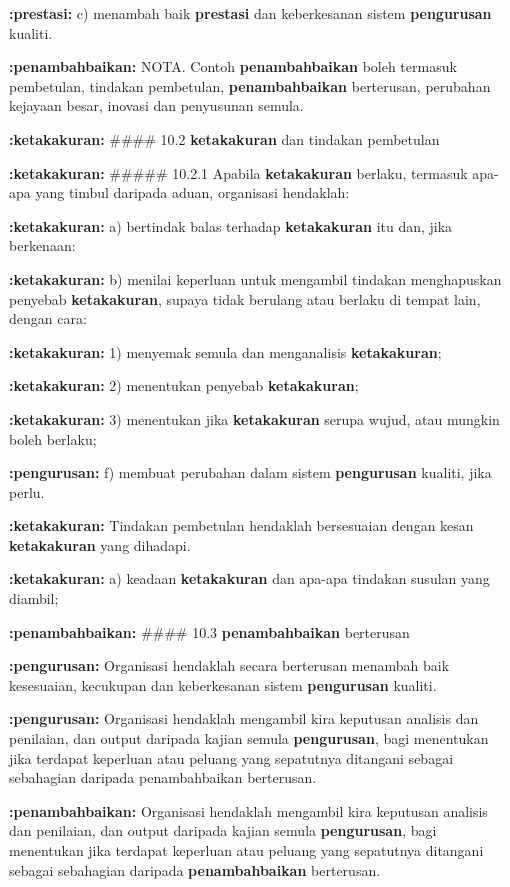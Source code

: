 \documentclass{article}
\begin{document}
\textbf{:prestasi:} c) menambah baik \textbf{prestasi} dan keberkesanan sistem \textbf{pengurusan} kualiti.

\textbf{:penambahbaikan:} NOTA. Contoh \textbf{penambahbaikan} boleh termasuk pembetulan, tindakan pembetulan, \textbf{penambahbaikan}
berterusan, perubahan kejayaan besar, inovasi dan penyusunan semula.

\textbf{:ketakakuran:} \#\#\#\# 10.2 \textbf{ketakakuran} dan tindakan pembetulan

\textbf{:ketakakuran:} \#\#\#\#\# 10.2.1 Apabila \textbf{ketakakuran} berlaku, termasuk apa-apa yang timbul daripada aduan,
organisasi hendaklah:

\textbf{:ketakakuran:} a) bertindak balas terhadap \textbf{ketakakuran} itu dan, jika berkenaan:

\textbf{:ketakakuran:} b) menilai keperluan untuk mengambil tindakan menghapuskan penyebab \textbf{ketakakuran},
supaya tidak berulang atau berlaku di tempat lain, dengan cara:

\textbf{:ketakakuran:} 1) menyemak semula dan menganalisis \textbf{ketakakuran};

\textbf{:ketakakuran:} 2) menentukan penyebab \textbf{ketakakuran};

\textbf{:ketakakuran:} 3) menentukan jika \textbf{ketakakuran} serupa wujud, atau mungkin boleh berlaku;

\textbf{:pengurusan:} f) membuat perubahan dalam sistem \textbf{pengurusan} kualiti, jika perlu.

\textbf{:ketakakuran:} Tindakan pembetulan hendaklah bersesuaian dengan kesan \textbf{ketakakuran} yang dihadapi.

\textbf{:ketakakuran:} a) keadaan \textbf{ketakakuran} dan apa-apa tindakan susulan yang diambil;

\textbf{:penambahbaikan:} \#\#\#\# 10.3 \textbf{penambahbaikan} berterusan

\textbf{:pengurusan:} Organisasi hendaklah secara berterusan menambah baik kesesuaian, kecukupan dan
keberkesanan sistem \textbf{pengurusan} kualiti.

\textbf{:pengurusan:} Organisasi hendaklah mengambil kira keputusan analisis dan penilaian, dan output daripada
kajian semula \textbf{pengurusan}, bagi menentukan jika terdapat keperluan atau peluang yang
sepatutnya ditangani sebagai sebahagian daripada penambahbaikan berterusan.

\textbf{:penambahbaikan:} Organisasi hendaklah mengambil kira keputusan analisis dan penilaian, dan output daripada
kajian semula \textbf{pengurusan}, bagi menentukan jika terdapat keperluan atau peluang yang
sepatutnya ditangani sebagai sebahagian daripada \textbf{penambahbaikan} berterusan.
\end{document}
